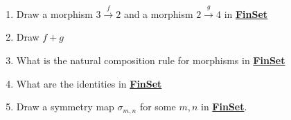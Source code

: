 \begin{enumerate}
    \item Draw a morphism $3 \xrightarrow f 2$ and a morphism $2 \xrightarrow g 4$ in \href{doc/1 math/Seven Sketches in Compositionality/Chapter 5: Signal flow graphs/2 Props and presentations/1 Props - definition and first examples/3 FinSet as prop}{\textbf{FinSet}}
    \item Draw $f+g$
    \item What is the natural composition rule for morphisms in \href{doc/1 math/Seven Sketches in Compositionality/Chapter 5: Signal flow graphs/2 Props and presentations/1 Props - definition and first examples/3 FinSet as prop}{\textbf{FinSet}}
    \item What are the identities in \href{doc/1 math/Seven Sketches in Compositionality/Chapter 5: Signal flow graphs/2 Props and presentations/1 Props - definition and first examples/3 FinSet as prop}{\textbf{FinSet}}
    \item Draw a symmetry map $\sigma_{m,n}$ for some $m,n$ in \href{doc/1 math/Seven Sketches in Compositionality/Chapter 5: Signal flow graphs/2 Props and presentations/1 Props - definition and first examples/3 FinSet as prop}{\textbf{FinSet}}.
  \end{enumerate}